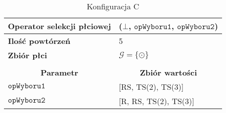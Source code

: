 \documentclass[twoside]{iisthesis}
\newcommand{\important}[1]{\mathcal{#1}}
\newcommand{\param}[1]{\mathtt{#1}}
\newcommand{\opName}[1]{\textproc{#1}}
\begin{document}
\begin{table}[h]
	\caption{Konfiguracja C \label{table:knapsack_config_compare_c}}
	\begin{tabularx}{\linewidth}{lX}
		\hline
		\multicolumn{1}{|l|}{{\bf Operator selekcji płciowej}}        & \multicolumn{1}{l|}{\opName{stdGenSel}($\bot$, $\param{opWyboru1}$, $\param{opWyboru2}$)} \\ \hline
		\multicolumn{1}{|l|}{{\bf Ilość powtórzeń}} & \multicolumn{1}{l|}{5}                                                                      \\ \hline
		\multicolumn{1}{|l|}{{\bf Zbiór płci}} & \multicolumn{1}{l|}{$\important{G} = \{ \odot \}$} \\  \hline
		&                                                                                             \\ \hline
		\multicolumn{1}{|c|}{{\bf Parametr}}        & \multicolumn{1}{c|}{{\bf Zbiór wartości}}                                                   \\ \hline \hline
		\multicolumn{1}{|l|}{$\param{opWyboru1}$}   & \multicolumn{1}{l|}{[RS, TS(2), TS(3)]}                                                   \\ \hline
		\multicolumn{1}{|l|}{$\param{opWyboru2}$}   & \multicolumn{1}{l|}{[R, RS, TS(2), TS(3)]} \\
		\hline
	\end{tabularx}
\end{table}
\end{document}
